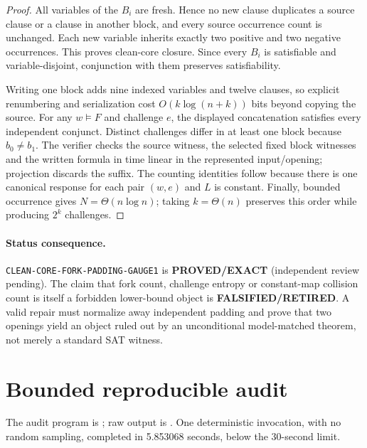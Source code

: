 \documentclass[11pt]{article}
\begin{document}
\begin{proof}
All variables of the $B_i$ are fresh.  Hence no new clause duplicates a
source clause or a clause in another block, and every source occurrence count
is unchanged.  Each new variable inherits exactly two positive and two
negative occurrences.  This proves clean-core closure.  Since every $B_i$ is
satisfiable and variable-disjoint, conjunction with them preserves
satisfiability.

Writing one block adds nine indexed variables and twelve clauses, so explicit
renumbering and serialization cost $O(k\log(n+k))$ bits beyond copying the
source.  For any $w\models F$ and challenge $e$, the displayed concatenation
satisfies every independent conjunct.  Distinct challenges differ in at
least one block because $b_0\ne b_1$.  The verifier checks the source witness,
the selected fixed block witnesses and the written formula in time linear in
the represented input/opening; projection discards the suffix.  The counting
identities follow because there is one canonical response for each pair
$(w,e)$ and $L$ is constant.  Finally, bounded occurrence gives
$N=\Theta(n\log n)$; taking $k=\Theta(n)$ preserves this order while producing
$2^k$ challenges.
\end{proof}

\paragraph{Status consequence.}
\texttt{CLEAN-CORE-FORK-PADDING-GAUGE1} is \textbf{PROVED/EXACT}
(independent review pending).  The claim that fork count, challenge entropy or
constant-map collision count is itself a forbidden lower-bound object is
\textbf{FALSIFIED/RETIRED}.  A valid repair must normalize away independent
padding and prove that two openings yield an object ruled out by an
unconditional model-matched theorem, not merely a standard SAT witness.

\section{Bounded reproducible audit}

The audit program is
; raw output is
.
One deterministic invocation, with no random sampling, completed in 5.853068
seconds, below the 30-second limit.
\end{document}
